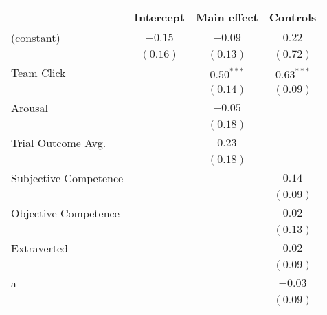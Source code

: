 
\begin{table}
\begin{center}
\begin{tabular}{l c c c }
\toprule
 & Intercept & Main effect & Controls \\
\midrule
(constant)                                        & $-0.15$  & $-0.09$               & $0.22$                \\
                                                  & $(0.16)$ & $(0.13)$              & $(0.72)$              \\
Team Click                                        &          & $\mathbf{0.50}^{***}$ & $\mathbf{0.63}^{***}$ \\
                                                  &          & $(0.14)$              & $(0.09)$              \\
Arousal                                           &          & $-0.05$               &                       \\
                                                  &          & $(0.18)$              &                       \\
Trial Outcome Avg.                                &          & $0.23$                &                       \\
                                                  &          & $(0.18)$              &                       \\
Subjective Competence                             &          &                       & $0.14$                \\
                                                  &          &                       & $(0.09)$              \\
Objective Competence                              &          &                       & $0.02$                \\
                                                  &          &                       & $(0.13)$              \\
Extraverted                                       &          &                       & $0.02$                \\
                                                  &          &                       & $(0.09)$              \\
a                                                 &          &                       & $-0.03$               \\
                                                  &          &                       & $(0.09)$              \\

\end{tabular}
\end{center}
\end{table}
